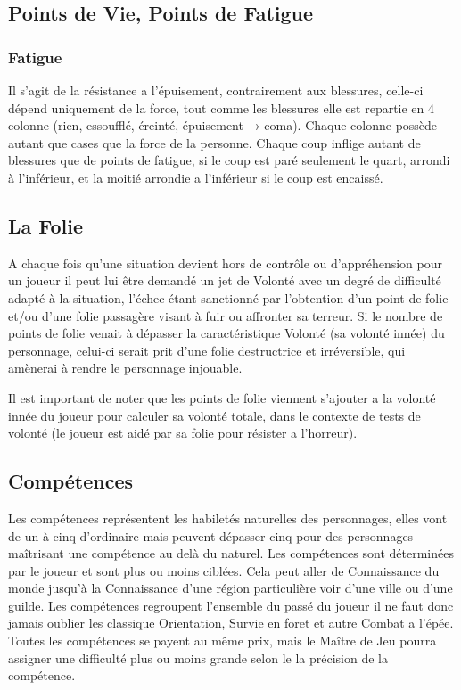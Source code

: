 \subsection{Points de Vie, Points de Fatigue}
\subsubsection{Fatigue}
Il s’agit de la résistance a l'épuisement, contrairement aux blessures, 
celle-ci dépend uniquement de la force, tout comme les blessures elle est repartie en 4 colonne (rien, essoufflé, éreinté, épuisement → coma). 
Chaque colonne possède autant que cases que la force de la personne.
Chaque coup inflige autant de blessures que de points de fatigue, si le coup est paré seulement le quart, 
arrondi à l'inférieur, et la moitié arrondie a l'inférieur si le coup est encaissé.

\subsection{La Folie}
A chaque fois qu'une situation devient hors de contrôle ou d'appréhension pour un joueur 
il peut lui être demandé un jet de Volonté avec un degré de difficulté adapté à la situation, 
l'échec étant sanctionné par l'obtention d'un point de folie et/ou d'une folie passagère visant à fuir ou affronter sa terreur. 
Si le nombre de points de folie venait à dépasser la caractéristique Volonté (sa volonté innée) du personnage, 
celui-ci serait prit d'une folie destructrice et irréversible, qui amènerai à rendre le personnage injouable.

Il est important de noter que les points de folie viennent s'ajouter a la volonté innée du joueur pour calculer sa volonté totale, 
dans le contexte de tests de volonté (le joueur est aidé par sa folie pour résister a l'horreur).

\subsection{Compétences}
Les compétences représentent les habiletés naturelles des personnages, 
elles vont de un à cinq d'ordinaire mais peuvent dépasser cinq pour des personnages maîtrisant une compétence au delà du naturel. 
Les compétences sont déterminées par le joueur et sont plus ou moins ciblées. 
Cela peut aller de Connaissance du monde jusqu'à la Connaissance d'une région particulière voir d'une ville ou d'une guilde. 
Les compétences regroupent l'ensemble du passé du joueur il ne faut donc jamais oublier les classique Orientation, 
Survie en foret et autre Combat a l'épée.\\
Toutes les compétences se payent au même prix, 
mais le Maître de Jeu pourra assigner une difficulté plus ou moins grande selon le la précision de la compétence.

